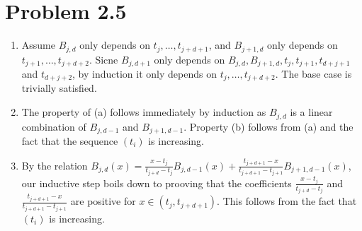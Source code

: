 \documentclass{article}
\begin{document}
\section*{Problem 2.5}

\begin{enumerate}
\item 
    Assume $B_{j,d}$ only depends on $t_j,\ldots, t_{j + d + 1}$,
    and $B_{j + 1,d}$ only depends on $t_{j + 1},\ldots, t_{j + d + 2}$.
    Sicne $B_{j,d + 1}$ only depends on $B_{j,d},B_{j + 1, d}, t_j, t_{j + 1}, t_{d + j + 1}$
    and $t_{d + j + 2}$,
    by induction it only depends on $t_j,\ldots, t_{j + d + 2}$.
    The base case is trivially satisfied.

\item
    The property of (a) follows immediately by induction as $B_{j,d}$
    is a linear combination of $B_{j,d - 1}$ and $B_{j + 1, d - 1}$.
    Property (b) follows from (a) and the fact that the sequence $(t_i)$ is increasing.

\item
    By the relation 
    $B_{j,d}(x)
    = \frac {x - t_j}{t_{j + d} - t_j} B_{j,d - 1}(x)
    + \frac {t_{j + d + 1} - x}{t_{j + d + 1} - t_{j + 1}} B_{j + 1, d - 1}(x)$,
    our inductive step boils down to prooving that the coefficients
    $\frac {x - t_j}{t_{j + d} - t_j}$ and
    $\frac {t_{j + d + 1} - x}{t_{j + d + 1} - t_{j + 1}}$
    are positive for $x\in(t_j, t_{j + d + 1})$.
    This follows from the fact that $(t_i)$ is increasing.

\end{enumerate}
\end{document}
